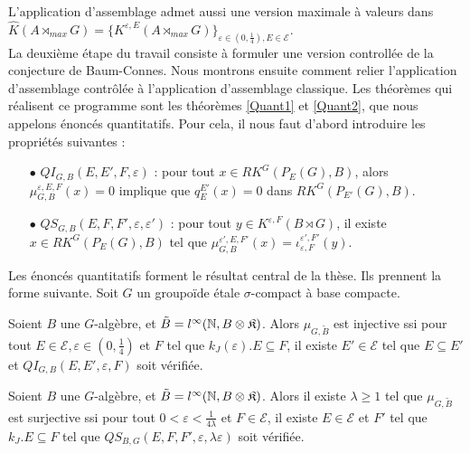L'application d'assemblage admet aussi une version maximale à valeurs dans $\hat K(A\rtimes_{max} G) = \{K^{\varepsilon,E}(A\rtimes_{max} G)\}_{\varepsilon \in (0,\frac{1}{4}),E\in\mathcal E}$.\\

La deuxième étape du travail consiste à formuler une version controllée de la conjecture de Baum-Connes. Nous montrons ensuite comment relier l'application d'assemblage contrôlée à l'application d'assemblage classique. Les théorèmes qui réalisent ce programme sont les théorèmes \ref{Quant1} et \ref{Quant2}, que nous appelons énoncés quantitatifs. Pour cela, il nous faut d'abord introduire les propriétés suivantes :\\
\begin{itemize}
\item[$\bullet$] $QI_{G,B}(E,E',F,\varepsilon)$ : pour tout $x\in RK^G(P_E(G), B )$, alors $\mu^{\varepsilon,E,F}_{G,B}(x) = 0$ implique que $q_E^{E'}(x)=0$ dans $RK^G(P_{E'}(G),B)$.
\item[$\bullet$] $QS_{G,B}(E,F,F',\varepsilon,\varepsilon')$ : pour tout $y\in K^{\varepsilon,F}(B\rtimes G)$, il existe $x\in RK^G(P_E(G),B)$ tel que $\mu^{\varepsilon',E,F'}_{G,B}(x)=\iota_{\varepsilon,F}^{\varepsilon',F'}(y)$.\\
\end{itemize} 

Les énoncés quantitatifs forment le résultat central de la thèse. Ils prennent la forme suivante. Soit $G$ un groupoïde étale $\sigma$-compact à base compacte.

\begin{thmfr}
Soient $B$ une $G$-algèbre, et $\tilde B = l^\infty(\mathbb N,B\otimes\mathfrak K)$. Alors $\mu_{G,\tilde B}$ est injective ssi pour tout $E\in\mathcal E,\varepsilon\in(0,\frac{1}{4})$ et $F$ tel que $k_J(\varepsilon).E\subseteq F$, il existe $E' \in\mathcal E$ tel que $E\subseteq E'$ et $QI_{G,B}(E,E',\varepsilon,F)$ soit vérifiée.
\end{thmfr}

\begin{thmfr}
Soient $B$ une $G$-algèbre, et $\tilde B = l^\infty(\mathbb N,B\otimes\mathfrak K)$. Alors il existe $\lambda \geq 1$ tel que $\mu_{G,\tilde B}$ est surjective ssi pour tout $0<\varepsilon<\frac{1}{4\lambda}$ et $F\in\mathcal E$, il existe $E\in\mathcal E$ et $F'$ tel que $k_J .E \subseteq F$ tel que $QS_{B,G}(E,F,F',\varepsilon,\lambda\varepsilon)$ soit vérifiée.
\end{thmfr}

